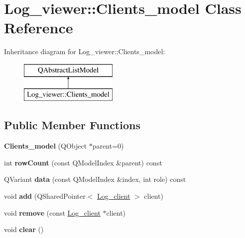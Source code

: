 \hypertarget{class_log__viewer_1_1_clients__model}{\section{Log\-\_\-viewer\-:\-:Clients\-\_\-model Class Reference}
\label{class_log__viewer_1_1_clients__model}
}
Inheritance diagram for Log\-\_\-viewer\-:\-:Clients\-\_\-model\-:\begin{figure}[H]
\begin{center}
\leavevmode
\includegraphics[height=2.000000cm]{class_log__viewer_1_1_clients__model}
\end{center}
\end{figure}
\subsection*{Public Member Functions}
\begin{DoxyCompactItemize}
\item 
\hypertarget{class_log__viewer_1_1_clients__model_ae3025cde857940ca06774f26f2427b9e}{{\bfseries Clients\-\_\-model} (Q\-Object $\ast$parent=0)}\label{class_log__viewer_1_1_clients__model_ae3025cde857940ca06774f26f2427b9e}

\item 
\hypertarget{class_log__viewer_1_1_clients__model_a27cd1770bc0a7725a562cc2d4ca25885}{int {\bfseries row\-Count} (const Q\-Model\-Index \&parent) const }\label{class_log__viewer_1_1_clients__model_a27cd1770bc0a7725a562cc2d4ca25885}

\item 
\hypertarget{class_log__viewer_1_1_clients__model_a59e88ce800e5fa1a717a01c2d90ece2d}{Q\-Variant {\bfseries data} (const Q\-Model\-Index \&index, int role) const }\label{class_log__viewer_1_1_clients__model_a59e88ce800e5fa1a717a01c2d90ece2d}

\item 
\hypertarget{class_log__viewer_1_1_clients__model_a8ab5e0f6ee051524bb5ce1f3f817eb2f}{void {\bfseries add} (Q\-Shared\-Pointer$<$ \hyperlink{class_log__viewer_1_1_log__client}{Log\-\_\-client} $>$ client)}\label{class_log__viewer_1_1_clients__model_a8ab5e0f6ee051524bb5ce1f3f817eb2f}

\item 
\hypertarget{class_log__viewer_1_1_clients__model_a4b683752dfac654431cd0b7f29d1029a}{void {\bfseries remove} (const \hyperlink{class_log__viewer_1_1_log__client}{Log\-\_\-client} $\ast$client)}\label{class_log__viewer_1_1_clients__model_a4b683752dfac654431cd0b7f29d1029a}

\item 
\hypertarget{class_log__viewer_1_1_clients__model_a7b2e3e695ff7af23551615a1872b544c}{void {\bfseries clear} ()}\label{class_log__viewer_1_1_clients__model_a7b2e3e695ff7af23551615a1872b544c}

\end{DoxyCompactItemize}


